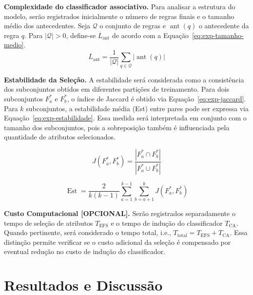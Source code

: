 \textbf{Complexidade do classificador associativo.} Para analisar a estrutura do modelo, serão registrados inicialmente o número de regras finais e o tamanho médio dos antecedentes. Seja $\mathcal{Q}$ o conjunto de regras e $\operatorname{ant}(q)$ o antecedente da
regra $q$. Para $|\mathcal{Q}|>0$, define-se $\overline{L}_{\mathrm{ant}}$ de acordo com a Equação~\ref{eq:exp-tamanho-medio}.
\begin{equation}\label{eq:exp-tamanho-medio}
    \overline{L}_{\mathrm{ant}}=
    \frac{1}{|\mathcal{Q}|}\sum_{q\in\mathcal{Q}}|\operatorname{ant}(q)|
\end{equation}

\textbf{Estabilidade da Seleção.} A estabilidade será considerada como a consistência dos subconjuntos obtidos
em diferentes partições de treinamento. Para dois subconjuntos
$F_a^{*}$ e $F_b^{*}$, o índice de Jaccard é obtido via Equação~\ref{eq:exp-jaccard}. Para $k$ subconjuntos, a estabilidade média (Est) entre pares pode ser expressa via Equação~\ref{eq:exp-estabilidade}. Essa medida será interpretada em conjunto com o tamanho dos subconjuntos,
pois a sobreposição também é influenciada pela quantidade de atributos
selecionados.

\begin{equation}\label{eq:exp-jaccard}
    J(F_a^{*},F_b^{*})=
    \frac{|F_a^{*}\cap F_b^{*}|}{|F_a^{*}\cup F_b^{*}|}
\end{equation}

\begin{equation}\label{eq:exp-estabilidade}
    \operatorname{Est}=
    \frac{2}{k(k-1)}\sum_{a=1}^{k-1}\sum_{b=a+1}^{k}
    J(F_a^{*},F_b^{*})
\end{equation}

\textbf{Custo Computacional [OPCIONAL].} Serão registrados separadamente o tempo de seleção de atributos
$T_{\mathrm{EFS}}$ e o tempo de indução do classificador
$T_{\mathrm{CA}}$. Quando pertinente, será considerado o tempo total, i.e., $T_{\mathrm{total}}=T_{\mathrm{EFS}}+T_{\mathrm{CA}}$. Essa distinção permite verificar se o custo adicional da seleção é compensado
por eventual redução no custo de indução do classificador.

\section{Resultados e Discussão}
\label{sec:exp-resultados}

